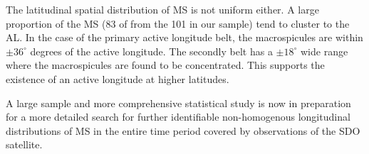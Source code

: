 The latitudinal spatial distribution of MS is not uniform either. A large proportion of the MS (83 of from the 101 in our sample) tend to cluster to the AL. In the case of the primary active longitude belt, the macrospicules are within $\pm 36^{\circ}$ degrees of the active longitude. The secondly belt has a $\pm 18^{\circ}$ wide range where the macrospicules are found to be concentrated. This supports the existence of an active longitude at higher latitudes.

A large sample and more comprehensive statistical study is now in preparation for a more detailed search for further identifiable non-homogenous longitudinal distributions of MS in the entire time period covered by observations of the SDO satellite.
